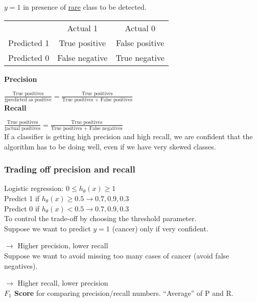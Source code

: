$y = 1$ in presence of \underline{rare} class to be detected.
\begin{center}
\begin{tabular}{ r|c|c| }
\multicolumn{1}{r}{}
 &  \multicolumn{1}{c}{Actual 1}
 & \multicolumn{1}{c}{Actual 0} \\
\cline{2-3}
Predicted 1& True positive & False positive \\
\cline{2-3}
Predicted 0 & False negative & True negative \\
\cline{2-3}
\end{tabular}
\end{center}

\textbf{Precision}

$\frac{\text{True positives}}{\sharp \text{predicted as positive}} = \frac{\text{True positives}}{\text{True positives + False positives}}$\\

\textbf{Recall}

$\frac{\text{True positives}}{\sharp \text{actual positives}} = \frac{\text{True positives}}{\text{True positives + False negatives}}$\\

If a classifier is getting high precision and high recall, we are confident that the algorithm has to be doing well, even if we have very skewed classes.

\subsubsection{Trading off precision and recall}
Logistic regression: $0 \leq h_\theta(x) \geq 1$\\
Predict 1 if $h_\theta(x) \geq 0.5 \rightarrow 0.7, 0.9, 0.3$\\
Predict 0 if $h_\theta(x) < 0.5 \rightarrow 0.7, 0.9, 0.3$\\

To control the trade-off by choosing the threshold parameter.\\
Suppose we want to predict $y = 1$ (cancer) only if very confident.

$\rightarrow$ Higher precision, lower recall\\
Suppose we want to avoid missing too many cases of cancer (avoid false negatives).

$\rightarrow$ Higher recall, lower precision\\

\textbf{$F_1$ Score} for comparing precision/recall numbers. ``Average'' of P and R.\\

